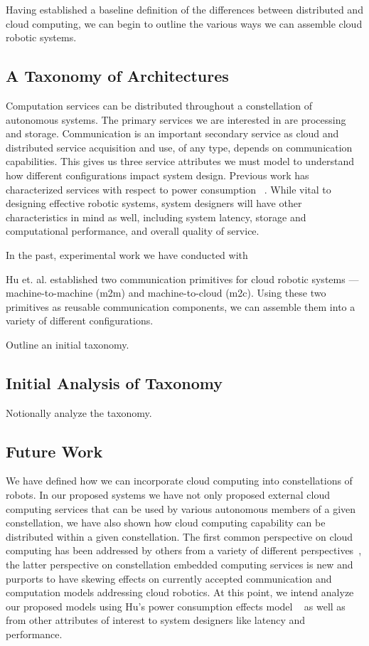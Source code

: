 \documentclass{sig-alternate}
\begin{document}
Having established a baseline definition of the differences between distributed and cloud computing, we can begin to outline the various ways we can assemble cloud robotic systems.

\subsection{A Taxonomy of Architectures}
Computation services can be distributed throughout a constellation of autonomous systems.  The primary services we are interested in are processing and storage.  Communication is an important secondary service as cloud and distributed service acquisition and use, of any type, depends on communication capabilities.  This gives us three service attributes we must model to understand how different configurations impact system design.  Previous work has characterized services with respect to power consumption ~\cite{HuTaWe:12}.  While vital to designing effective robotic systems, system designers will have other characteristics in mind as well, including system latency, storage and computational performance, and overall quality of service.

In the past, experimental work we have conducted with 

Hu et. al. established two communication primitives for cloud robotic systems --- machine-to-machine (m2m) and machine-to-cloud (m2c).  Using these two primitives as reusable communication components, we can assemble them into a variety of different configurations.

Outline an initial taxonomy.

\subsection{Initial Analysis of Taxonomy}
Notionally analyze the taxonomy.

\subsection{Future Work}
We have defined how we can incorporate cloud computing into constellations of robots.  In our proposed systems we have not only proposed external cloud computing services that can be used by various autonomous members of a given constellation, we have also shown how cloud computing capability can be distributed within a given constellation.  The first common perspective on cloud computing has been addressed by others from a variety of different perspectives~\cite{LoSi:13,HuWeYo:12,YiZhGa:10}, the latter perspective on constellation embedded computing services is new and purports to have skewing effects on currently accepted communication and computation models addressing cloud robotics.  At this point, we intend analyze our proposed models using Hu's power consumption effects model ~\cite{HuWeYo:12} as well as from other attributes of interest to system designers like latency and performance.
\end{document}
